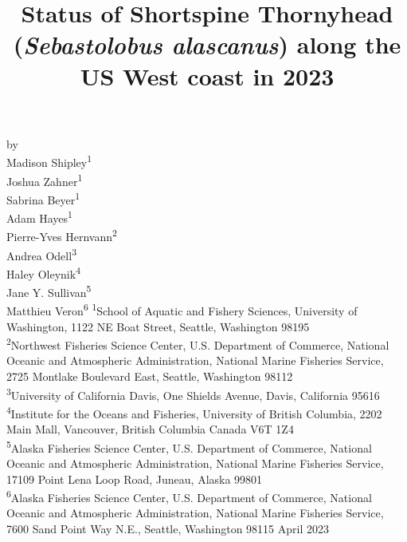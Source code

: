 \documentclass[11pt,
  english,
  letterpaper,
]{article}
\date{}
\newcommand{\trTitle}{Status of Shortspine Thornyhead (\emph{Sebastolobus alascanus}) along the US West coast in 2023}
\newcommand{\trYear}{2023}
\newcommand{\trMonth}{April}
\begin{document}

\renewcommand*{\thefootnote}{\fnsymbol{footnote}}

\small
\thispagestyle{empty}
\noindent
\begin{center}
\title{Status of Shortspine Thornyhead (\emph{Sebastolobus alascanus}) along the US West coast in 2023}
\vspace{1.5cm}
{\Large\textbf{}}
\vfill
by\\
Madison Shipley\textsuperscript{1}\\
Joshua Zahner\textsuperscript{1}\\
Sabrina Beyer\textsuperscript{1}\\
Adam Hayes\textsuperscript{1}\\
Pierre-Yves Hernvann\textsuperscript{2}\\
Andrea Odell\textsuperscript{3}\\
Haley Oleynik\textsuperscript{4}\\
Jane Y. Sullivan\textsuperscript{5}\\
Matthieu Veron\textsuperscript{6}\vfill
\textsuperscript{1}School of Aquatic and Fishery Sciences, University of Washington, 1122 NE Boat Street, Seattle, Washington 98195\\
\textsuperscript{2}Northwest Fisheries Science Center, U.S. Department of Commerce, National Oceanic and Atmospheric Administration, National Marine Fisheries Service, 2725 Montlake Boulevard East, Seattle, Washington 98112\\
\textsuperscript{3}University of California Davis, One Shields Avenue, Davis, California 95616\\
\textsuperscript{4}Institute for the Oceans and Fisheries, University of British Columbia, 2202 Main Mall, Vancouver, British Columbia Canada V6T 1Z4\\
\textsuperscript{5}Alaska Fisheries Science Center, U.S. Department of Commerce, National Oceanic and Atmospheric Administration, National Marine Fisheries Service, 17109 Point Lena Loop Road, Juneau, Alaska 99801\\
\textsuperscript{6}Alaska Fisheries Science Center, U.S. Department of Commerce, National Oceanic and Atmospheric Administration, National Marine Fisheries Service, 7600 Sand Point Way N.E., Seattle, Washington 98115\vfill
\trMonth{} \trYear{}
\end{center}
\clearpage
\end{document}

